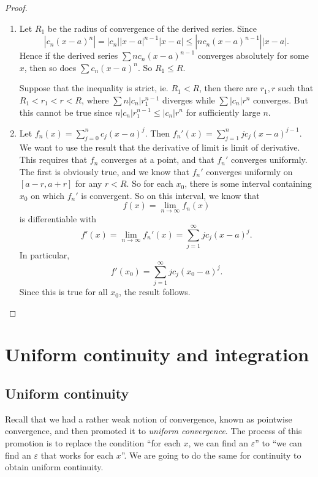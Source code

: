 \documentclass[a4paper]{article}
\begin{document}
\begin{proof}\leavevmode
  \begin{enumerate}
    \item Let $R_1$ be the radius of convergence of the derived series. Since
      \[
        |c_n(x - a)^n| = |c_n||x - a|^{n - 1}|x - a| \leq |n c_n (x - a)^{n - 1}| |x - a|.
      \]
      Hence if the derived series $\sum n c_n(x - a)^{n - 1}$ converges absolutely for some $x$, then so does $\sum c_n (x - a)^n$. So $R_1 \leq R$.

      Suppose that the inequality is strict, ie. $R_1 < R$, then there are $r_1, r$ such that $R_1 < r_1 < r < R$, where $\sum n|c_n| r_1^{n - 1}$ diverges while $\sum |c_n| r^n$ converges. But this cannot be true since $n|c_n| r_1^{n - 1} \leq |c_n| r^n$ for sufficiently large $n$.

    \item Let $f_n(x) = \sum\limits_{j = 0}^n c_j (x - a)^j$. Then $f_n '(x) = \sum\limits_{j = 1}^n j c_j (x - a)^{j - 1}$. We want to use the result that the derivative of limit is limit of derivative. This requires that $f_n$ converges at a point, and that $f_n'$ converges uniformly. The first is obviously true, and we know that $f_n'$ converges uniformly on $[a - r, a + r]$ for any $r < R$. So for each $x_0$, there is some interval containing $x_0$ on which $f_n'$ is convergent. So on this interval, we know that
      \[
        f(x) = \lim_{n \to \infty}f_n (x)
      \]
      is differentiable with
      \[
        f'(x) = \lim_{n \to \infty}f_n'(x) = \sum_{j = 1}^\infty jc_j (x - a)^j.
      \]
      In particular,
      \[
        f'(x_0) = \sum_{j = 1}^\infty jc_j (x_0 - a)^j.
      \]
      Since this is true for all $x_0$, the result follows.
  \end{enumerate}
\end{proof}

\section{Uniform continuity and integration}
\subsection{Uniform continuity}
Recall that we had a rather weak notion of convergence, known as pointwise convergence, and then promoted it to \emph{uniform convergence}. The process of this promotion is to replace the condition ``for each $x$, we can find an $\varepsilon$'' to ``we can find an $\varepsilon$ that works for each $x$''. We are going to do the same for continuity to obtain uniform continuity.
\end{document}
